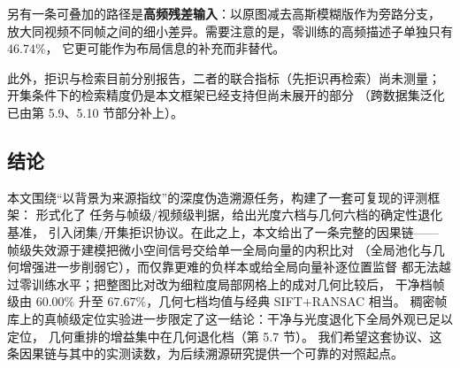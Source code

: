 另有一条可叠加的路径是\textbf{高频残差输入}：以原图减去高斯模糊版作为旁路分支，
放大同视频不同帧之间的细小差异。需要注意的是，零训练的高频描述子单独只有 $46.74\%$，
它更可能作为布局信息的补充而非替代。

此外，拒识与检索目前分别报告，二者的联合指标（先拒识再检索）尚未测量；
开集条件下的检索精度仍是本文框架已经支持但尚未展开的部分
（跨数据集泛化已由第 5.9、5.10 节部分补上）。

\subsection{结论}

本文围绕“以背景为来源指纹”的深度伪造溯源任务，构建了一套可复现的评测框架：
形式化了 \aura{} 任务与帧级$/$视频级判据，给出光度六档与几何六档的确定性退化基准，
引入闭集$/$开集拒识协议。在此之上，本文给出了一条完整的因果链——
帧级失效源于建模把微小空间信号交给单一全局向量的内积比对
（全局池化与几何增强进一步削弱它），而仅靠更难的负样本或给全局向量补逐位置监督
都无法越过零训练水平；把整图比对改为细粒度局部网格上的成对几何比较后，
干净档帧级由 $60.00\%$ 升至 $67.67\%$，几何七档均值与经典 SIFT$+$RANSAC 相当。
稠密帧库上的真帧级定位实验进一步限定了这一结论：干净与光度退化下全局外观已足以定位，
几何重排的增益集中在几何退化档（第 5.7 节）。
我们希望这套协议、这条因果链与其中的实测读数，为后续溯源研究提供一个可靠的对照起点。

